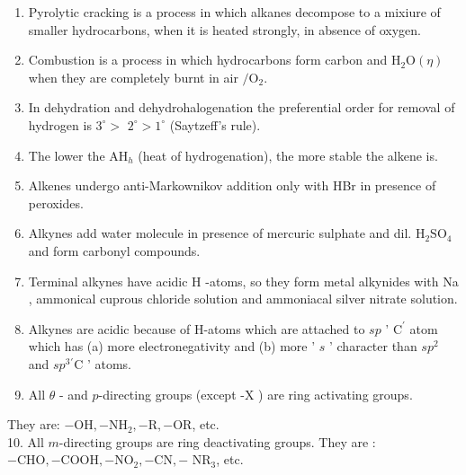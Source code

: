 \documentclass[10pt]{article}
\begin{document}
\begin{enumerate}
  \item Pyrolytic cracking is a process in which alkanes decompose to a mixiure of smaller hydrocarbons, when it is heated strongly, in absence of oxygen.
  \item Combustion is a process in which hydrocarbons form carbon and $\mathrm{H}_{2} \mathrm{O}(\eta)$ when they are completely burnt in air $/ \mathrm{O}_{2}$.
  \item In dehydration and dehydrohalogenation the preferential order for removal of hydrogen is $3^{\circ}>$ $2^{\circ}>1^{\circ}$ (Saytzeff's rule).
  \item The lower the $\mathrm{AH}_{h}$ (heat of hydrogenation), the more stable the alkene is.
  \item Alkenes undergo anti-Markownikov addition only with HBr in presence of peroxides.
  \item Alkynes add water molecule in presence of mercuric sulphate and dil. $\mathrm{H}_{2} \mathrm{SO}_{4}$ and form carbonyl compounds.
  \item Terminal alkynes have acidic H -atoms, so they form metal alkynides with Na , ammonical cuprous chloride solution and ammoniacal silver nitrate solution.
  \item Alkynes are acidic because of H-atoms which are attached to $s p$ ' $\mathrm{C}^{\prime}$ atom which has (a) more electronegativity and (b) more ' $s$ ' character than $s p^{2}$ and $s p^{3}{ }^{\prime} \mathrm{C}$ ' atoms.
  \item All $\theta$ - and $p$-directing groups (except -X ) are ring activating groups.
\end{enumerate}

They are: $-\mathrm{OH},-\mathrm{NH}_{2},-\mathrm{R},-\mathrm{OR}$, etc.\\
10. All $m$-directing groups are ring deactivating groups. They are : $-\mathrm{CHO},-\mathrm{COOH},-\mathrm{NO}_{2},-\mathrm{CN},-$ $\mathrm{NR}_{3}$, etc.
\end{document}
